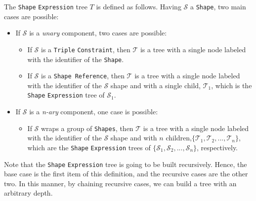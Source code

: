 \begin{definition}
    The \texttt{Shape} \texttt{Expression} tree $T$ is defined as follows. Having $\mathcal{S}$ a \texttt{Shape}, two main cases are possible:

    \begin{itemize}
        \itemsep0.5em
        \item If $\mathcal{S}$ is a \textit{unary} component, two cases are possible:
              \begin{itemize}
                  \itemsep0.25em
                  \item If $\mathcal{S}$ is a \texttt{Triple} \texttt{Constraint}, then $\mathcal{T}$ is a tree with a single node labeled with the identifier of the \texttt{Shape}.
                  \item If $\mathcal{S}$ is a \texttt{Shape Reference}, then $\mathcal{T}$ is a tree with a single node labeled with the identifier of the $\mathcal{S}$ shape and with a single child, $\mathcal{T}_1$, which is the \texttt{Shape} \texttt{Expression} tree of $\mathcal{S}_1$.
              \end{itemize}
        \item If $\mathcal{S}$ is a \textit{n-ary} component, one case is possible:
              \begin{itemize}
                  \itemsep0.25em
                  \item If $\mathcal{S}$ wraps a group of \texttt{Shapes}, then $\mathcal{T}$ is a tree with a single node labeled with the identifier of the $\mathcal{S}$ shape and with $n$ children,$\{\mathcal{T}_1, \mathcal{T}_2, ..., \mathcal{T}_n\}$, which are the \texttt{Shape} \texttt{Expression} trees of $\{\mathcal{S}_1, \mathcal{S}_2, ..., \mathcal{S}_n\}$, respectively.
              \end{itemize}
    \end{itemize}

    Note that the \texttt{Shape} \texttt{Expression} tree is going to be built recursively. Hence, the base case is the first item of this definition, and the recursive cases are the other two. In this manner, by chaining recursive cases, we can build a tree with an arbitrary depth.
\end{definition}


